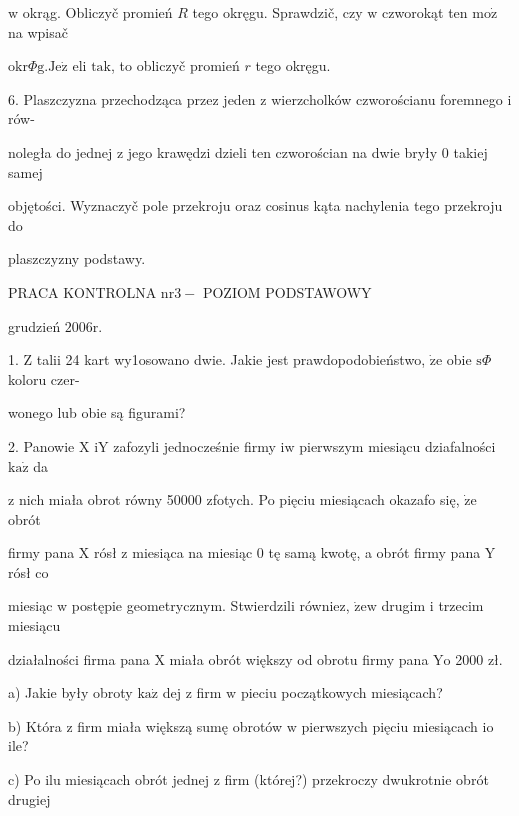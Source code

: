 \documentclass[a4paper,12pt]{article}
\begin{document}
$\mathrm{w}$ okrąg. Obliczyč promień $R$ tego okręgu. Sprawdzič, czy $\mathrm{w}$ czworokąt ten $\mathrm{m}\mathrm{o}\dot{\mathrm{z}}$ na wpisač

$\mathrm{o}\mathrm{k}\mathrm{r}\Phi \mathrm{g}. \mathrm{J}\mathrm{e}\dot{\mathrm{z}}$ eli $\mathrm{t}\mathrm{a}\mathrm{k}$, to obliczyč promień $r$ tego okręgu.

6. Plaszczyzna przechodząca przez jeden $\mathrm{z}$ wierzcholków czworościanu foremnego $\mathrm{i}$ rów-

noległa do jednej $\mathrm{z}$ jego krawędzi dzieli ten czworościan na dwie bryły $0$ takiej samej

objętości. Wyznaczyč pole przekroju oraz cosinus kąta nachylenia tego przekroju do

plaszczyzny podstawy.





PRACA KONTROLNA $\mathrm{n}\mathrm{r}3-$ POZIOM PODSTAWOWY

grudzień $2006\mathrm{r}.$

1. $\mathrm{Z}$ talii 24 kart wy1osowano dwie. Jakie jest prawdopodobieństwo, $\dot{\mathrm{z}}\mathrm{e}$ obie $\mathrm{s}\Phi$ koloru czer-

wonego lub obie są figurami?

2. Panowie X $\mathrm{i}\mathrm{Y}$ zafozyli jednocześnie firmy $\mathrm{i}\mathrm{w}$ pierwszym miesiącu dziafalności $\mathrm{k}\mathrm{a}\dot{\mathrm{z}}$ da

$\mathrm{z}$ nich miała obrot równy 50000 zfotych. Po pięciu miesiącach okazafo się, $\dot{\mathrm{z}}\mathrm{e}$ obrót

firmy pana X rósł $\mathrm{z}$ miesiąca na miesiąc $0$ tę samą kwotę, a obrót firmy pana $\mathrm{Y}$ rósł co

miesiąc $\mathrm{w}$ postępie geometrycznym. Stwierdzili równiez, $\dot{\mathrm{z}}\mathrm{e}\mathrm{w}$ drugim $\mathrm{i}$ trzecim miesiącu

działalności firma pana X miała obrót większy od obrotu firmy pana $\mathrm{Y}\mathrm{o}$ 2000 zł.

a) Jakie były obroty $\mathrm{k}\mathrm{a}\dot{\mathrm{z}}$ dej $\mathrm{z}$ firm $\mathrm{w}$ pieciu początkowych miesiącach?

b) Która $\mathrm{z}$ firm miała większą sumę obrotów $\mathrm{w}$ pierwszych pięciu miesiącach $\mathrm{i}\mathrm{o}$ ile?

c) Po ilu miesiącach obrót jednej $\mathrm{z}$ firm (której?) przekroczy dwukrotnie obrót drugiej
\end{document}
